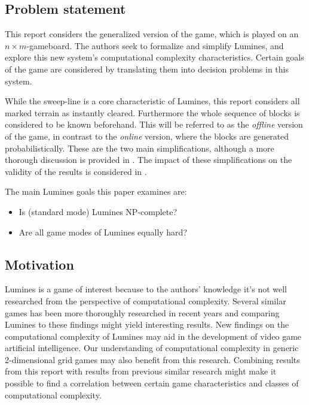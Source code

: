 \subsection{Problem statement}
This report considers the generalized version of the game, which is played on an $n \times m$-gameboard. The authors seek to formalize and  simplify Lumines, and explore this new system's computational complexity characteristics. Certain goals of the game are considered by translating them into decision problems in this system.

While the sweep-line is a core characteristic of Lumines, this report considers all marked terrain as instantly cleared. Furthermore the whole sequence of blocks is considered to be known beforehand. This will be referred to as the \textit{offline} version of the game, in contrast to the \textit{online} version, where the blocks are generated probabilistically. These are the two main simplifications, although a more thorough discussion is provided in . The impact of these simplifications on the validity of the results is considered in .

The main Lumines goals this paper examines are:
\begin{itemize}
        \item Is (standard mode) Lumines NP-complete?
        \item Are all game modes of Lumines equally hard?
\end{itemize}

\subsection{Motivation}

Lumines is a game of interest because to the authors' knowledge it's not well researched from the perspective of computational complexity. Several similar games has been more thoroughly researched in recent years and comparing Lumines to these findings might yield interesting results. New findings on the computational complexity of Lumines may aid in the development of video game artificial intelligence. Our understanding of computational complexity in generic 2-dimensional grid games may also benefit from this research. Combining results from this report with results from previous similar research might make it possible to find a correlation between certain game characteristics and classes of computational complexity.
